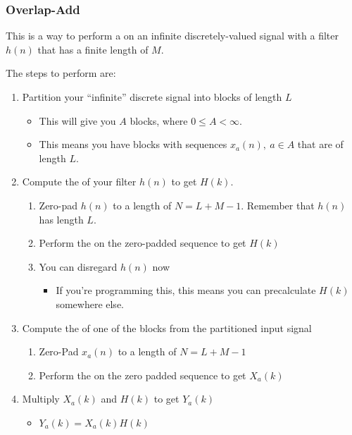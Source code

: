 \subsubsection{Overlap-Add}\label{subsubsec:DFT_Application-Overlap_Add}
This is a way to perform a  on an infinite discretely-valued signal with a filter $h(n)$ that has a finite length of $M$.

The steps to perform  are:
\begin{enumerate}[noitemsep]
\item Partition your ``infinite'' discrete signal into blocks of length $L$
  \begin{itemize}[noitemsep]
  \item This will give you $A$ blocks, where $0 \leq A < \infty$.
  \item This means you have blocks with sequences $x_{a}(n), \: a \in A$ that are of length $L$.
  \end{itemize}
\item Compute the  of your filter $h(n)$ to get $H(k)$.
  \begin{enumerate}[noitemsep]
  \item Zero-pad $h(n)$ to a length of $N=L+M-1$. Remember that $h(n)$ has length $L$.
  \item Perform the  on the zero-padded sequence to get $H(k)$
  \item You can disregard $h(n)$ now
    \begin{itemize}[noitemsep]
    \item If you're programming this, this means you can precalculate $H(k)$ somewhere else.
    \end{itemize}
  \end{enumerate}
\item Compute the  of one of the blocks from the partitioned input signal
  \begin{enumerate}[noitemsep]
  \item Zero-Pad $x_{a}(n)$ to a length of $N=L+M-1$
  \item Perform the  on the zero padded sequence to get $X_{a}(k)$
  \end{enumerate}
\item Multiply $X_{a}(k)$ and $H(k)$ to get $Y_{a}(k)$
  \begin{itemize}[noitemsep]
  \item $Y_{a}(k) = X_{a}(k) H(k)$
  \end{itemize}

\end{enumerate}
